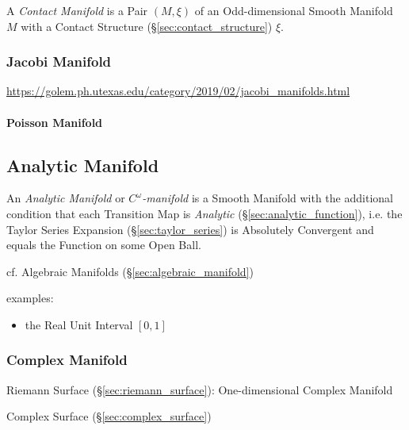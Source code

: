 A \emph{Contact Manifold} is a Pair $(M,\xi)$ of an Odd-dimensional Smooth
Manifold $M$ with a Contact Structure (\S\ref{sec:contact_structure}) $\xi$.



\subsubsection{Jacobi Manifold}\label{sec:jacobi_manifold}

\url{https://golem.ph.utexas.edu/category/2019/02/jacobi_manifolds.html}



\paragraph{Poisson Manifold}\label{sec:poisson_manifold}\hfill



\subsection{Analytic Manifold}\label{sec:analytic_manifold}

An \emph{Analytic Manifold} or \emph{$C^\omega$-manifold} is a Smooth Manifold
with the additional condition that each Transition Map is \emph{Analytic}
(\S\ref{sec:analytic_function}), i.e. the Taylor Series Expansion
(\S\ref{sec:taylor_series}) is Absolutely Convergent and equals the Function on
some Open Ball.

cf. Algebraic Manifolds (\S\ref{sec:algebraic_manifold})

examples:
\begin{itemize}
  \item the Real Unit Interval $[0,1]$
\end{itemize}



\subsubsection{Complex Manifold}\label{sec:complex_manifold}

Riemann Surface (\S\ref{sec:riemann_surface}): One-dimensional Complex
Manifold


Complex Surface (\S\ref{sec:complex_surface})

